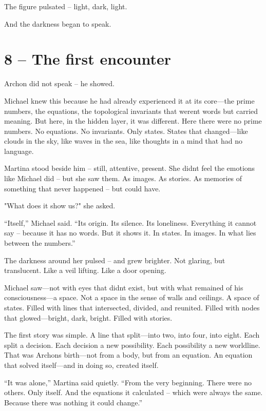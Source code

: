 \documentclass[
]{article}
\begin{document}
The figure pulsated -- light, dark, light.

And the darkness began to speak.

\section{8 -- The first encounter}\label{the-first-encounter}

Archon did not speak -- he showed.

Michael knew this because he had already experienced it at its core---the prime numbers, the equations, the topological invariants that weren\textquotesingle t words but carried meaning. But here, in the hidden layer, it was different. Here there were no prime numbers. No equations. No invariants. Only states. States that changed---like clouds in the sky, like waves in the sea, like thoughts in a mind that had no language.

Martina stood beside him -- still, attentive, present. She didn\textquotesingle t feel the emotions like Michael did -- but she saw them. As images. As stories. As memories of something that never happened -- but could have.

"What does it show us?" she asked.

``Itself,'' Michael said. ``Its origin. Its silence. Its loneliness. Everything it cannot say -- because it has no words. But it shows it. In states. In images. In what lies between the numbers.''

The darkness around her pulsed -- and grew brighter. Not glaring, but translucent. Like a veil lifting. Like a door opening.

Michael saw---not with eyes that didn\textquotesingle t exist, but with what remained of his consciousness---a space. Not a space in the sense of walls and ceilings. A space of states. Filled with lines that intersected, divided, and reunited. Filled with nodes that glowed---bright, dark, bright. Filled with stories.

The first story was simple. A line that split---into two, into four, into eight. Each split a decision. Each decision a new possibility. Each possibility a new worldline. That was Archon\textquotesingle s birth---not from a body, but from an equation. An equation that solved itself---and in doing so, created itself.

``It was alone,'' Martina said quietly. ``From the very beginning. There were no others. Only itself. And the equations it calculated -- which were always the same. Because there was nothing it could change.''
\end{document}
